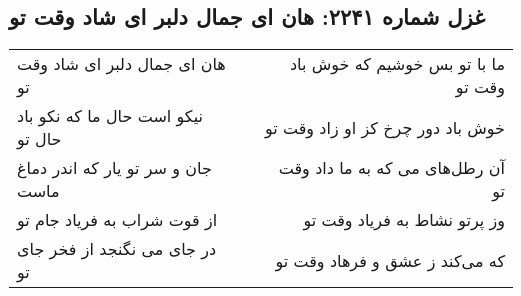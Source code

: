 \begin{center}
\section*{غزل شماره ۲۲۴۱: هان ای جمال دلبر ای شاد وقت تو}
\label{sec:2241}
\begin{longtable}{l p{0.5cm} r}
هان ای جمال دلبر ای شاد وقت تو
&&
ما با تو بس خوشیم که خوش باد وقت تو
\\
نیکو است حال ما که نکو باد حال تو
&&
خوش باد دور چرخ کز او زاد وقت تو
\\
جان و سر تو یار که اندر دماغ ماست
&&
آن رطل‌های می که به ما داد وقت تو
\\
از قوت شراب به فریاد جام تو
&&
وز پرتو نشاط به فریاد وقت تو
\\
در جای می نگنجد از فخر جای تو
&&
که می‌کند ز عشق و فرهاد وقت تو
\\
\end{longtable}
\end{center}
